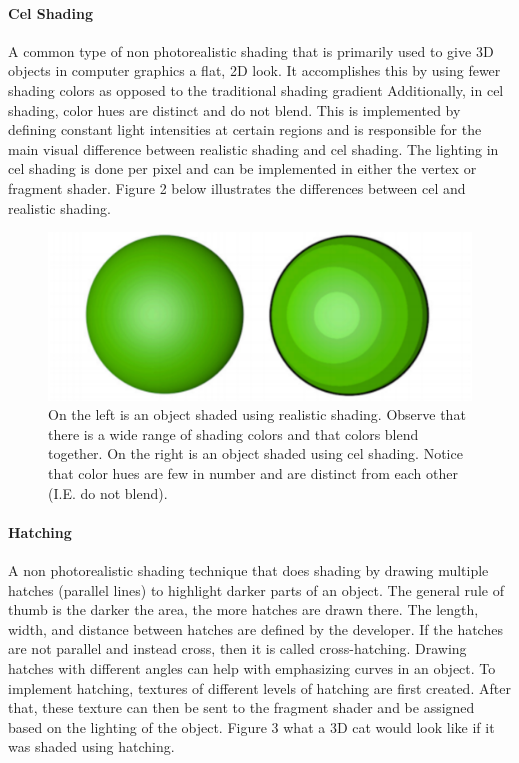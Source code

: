 \paragraph{Cel Shading}
A common type of non photorealistic shading that is primarily used to give 3D objects in computer graphics a flat, 2D look. 
It accomplishes this by using fewer shading colors as opposed to the traditional shading gradient
Additionally, in cel shading, color hues are distinct and do not blend. \cite{celshading}
This is implemented by defining constant light intensities at certain regions and is responsible for the main visual difference between realistic shading and cel shading. 
The lighting in cel shading is done per pixel and can be implemented in either the vertex or fragment shader. \cite{nonphotshading} 
Figure 2 below illustrates the differences between cel and realistic shading.

\begin{figure} [H]
  \includegraphics[scale=0.5]{techreview_v1/two.eps}
  \caption
{ \newline \hspace{\linewidth}
On the left is an object shaded using realistic shading. 
Observe that there is a wide range of shading colors and that colors blend together. 
On the right is an object shaded using cel shading.
Notice that color hues are few in number and are distinct from each other (I.E. do not blend).}
  \label{fig:two}
\end{figure}

\paragraph{Hatching}
A non photorealistic shading technique that does shading by drawing multiple hatches (parallel lines) to highlight darker parts of an object. 
The general rule of thumb is the darker the area, the more hatches are drawn there. 
The length, width, and distance between hatches are defined by the developer.
If the hatches are not parallel and instead cross, then it is called cross-hatching. \cite{hatch}
Drawing hatches with different angles can help with emphasizing curves in an object.
To implement hatching, textures of different levels of hatching are first created. 
After that, these texture can then be sent to the fragment shader and be assigned based on the lighting of the object.
Figure 3 what a 3D cat would look like if it was shaded using hatching.

